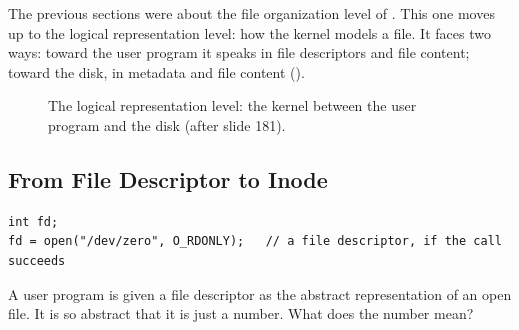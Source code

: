 The previous sections were about the file organization level of . This one moves up to the logical representation level: how the kernel models a file. It faces two ways: toward the user program it speaks in file descriptors and file content; toward the disk, in metadata and file content ().

\begin{figure}[H]
\centering
{}
\caption{The logical representation level: the kernel between the user program and the disk (after slide 181).}
\label{fig:logiclevel}
\end{figure}

\subsection{From File Descriptor to Inode}

\begin{lstlisting}
int fd;
fd = open("/dev/zero", O_RDONLY);   // a file descriptor, if the call succeeds
\end{lstlisting}
A user program is given a file descriptor as the abstract representation of an open file. It is so abstract that it is just a number. What does the number mean?

